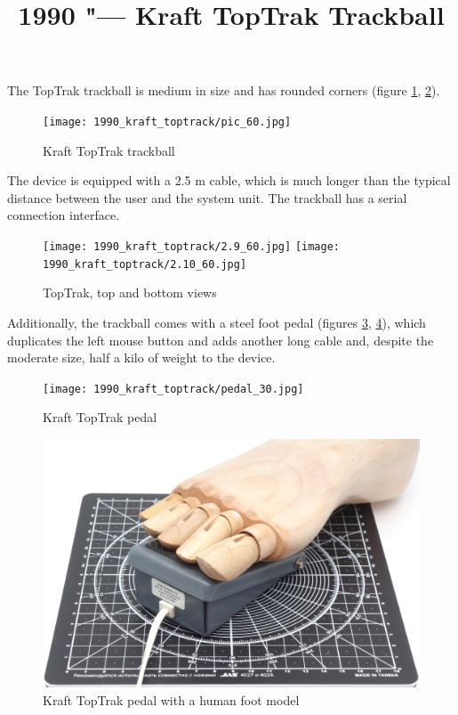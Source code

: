 \documentclass[11pt, a4paper]{article}
\begin{document}
\title{1990 "--- Kraft TopTrak Trackball}
\date{}
\maketitle
{}
The TopTrak trackball is medium in size and has rounded corners (figure \ref{fig:TopTrakPic}, \ref{fig:TopTrakTopAndBottom}).

\begin{figure}[h]
    \centering
    \texttt{[image: 1990\_kraft\_toptrack/pic\_60.jpg]}
    \caption{Kraft TopTrak trackball}
    \label{fig:TopTrakPic}
\end{figure}

The device is equipped with a 2.5 m cable, which is much longer than the typical distance between the user and the system unit. The trackball has a serial connection interface.

\begin{figure}[h]
    \centering
    \texttt{[image: 1990\_kraft\_toptrack/2.9\_60.jpg]}
    \texttt{[image: 1990\_kraft\_toptrack/2.10\_60.jpg]}
    \caption{TopTrak, top and bottom views}
    \label{fig:TopTrakTopAndBottom}
\end{figure}

Additionally, the trackball comes with a steel foot pedal (figures \ref{fig:TopTrakPedal}, \ref{fig:TopTrakPedalFoot}), which duplicates the left mouse button and adds another long cable and, despite the moderate size, half a kilo of weight to the device.

\begin{figure}[h]
    \centering
    \texttt{[image: 1990\_kraft\_toptrack/pedal\_30.jpg]}
    \caption{Kraft TopTrak pedal}
    \label{fig:TopTrakPedal}
\end{figure}

\begin{figure}[h]
    \centering
    \includegraphics[scale=0.25]{1990_kraft_toptrack/pedal_foot_30.jpg}
    \caption{Kraft TopTrak pedal with a human foot model}
    \label{fig:TopTrakPedalFoot}
\end{figure}
\end{document}
